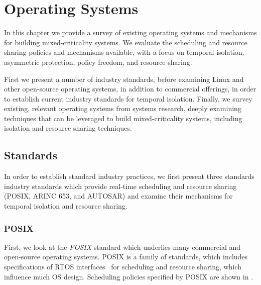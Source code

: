 

\chapter{Operating Systems}
\label{chap:operating-systems}

In this chapter we provide a survey of existing operating systems and mechanisms for building
mixed-criticality systems. We evaluate
the scheduling and resource sharing policies and mechanisms available, with a focus on temporal isolation,
asymmetric protection, policy freedom, and resource sharing.  

First we present a number of industry standards, before examining
Linux and other open-source operating systems, in addition to
commercial offerings, in order to establish current industry standards for temporal isolation.
Finally, we survey existing, relevant operating systems
from systems research, deeply examining techniques that can be leveraged to build mixed-criticality
systems, including isolation and resource sharing techniques.

\section{Standards}

In order to establish standard industry practices, we first present three standards industry
standards which provide real-time scheduling and resource sharing (POSIX, ARINC
653, and AUTOSAR) and examine their mechanisms for temporal isolation and resource sharing.

\subsection{POSIX}

First, we look at the \emph{\gls{POSIX}} standard which underlies many commercial and open-source operating
systems. 
\gls{POSIX} is a family of standards, which includes specifications of \gls{RTOS} interfaces~\citep{Harbour_93} for scheduling and
resource sharing, which
influence much \gls{OS} design.  Scheduling policies specified by \gls{POSIX} are shown in
. 

